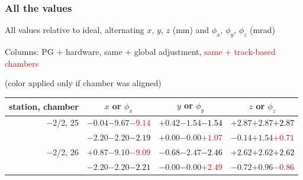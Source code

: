 \documentclass[compress]{beamer}
\begin{document}
\begin{frame}
\frametitle{All the values}
\tiny

All values relative to ideal, alternating $x$, $y$, $z$ (mm) and $\phi_x$, $\phi_y$, $\phi_z$ (mrad)

Columns: PG $+$ hardware, same $+$ global adjustment, \textcolor{red}{same $+$ track-based chambers}

\hfill (color applied only if chamber was aligned)

\vfill
\renewcommand{\arraystretch}{1.1}
\begin{tabular}{r | c | c | c}
station, chamber & $x$ or $\phi_x$ & $y$ or $\phi_y$ & $z$ or $\phi_z$ \\\hline
$-$2/2, 25 & $-0.04$\hspace{0.1 cm}$-9.67$\hspace{0.1 cm}\textcolor{red}{$-9.14$} & $+0.42$\hspace{0.1 cm}$-1.54$\hspace{0.1 cm}\textcolor{black}{$-1.54$} & $+2.87$\hspace{0.1 cm}$+2.87$\hspace{0.1 cm}\textcolor{black}{$+2.87$} \\
           & $-2.20$\hspace{0.1 cm}$-2.20$\hspace{0.1 cm}\textcolor{black}{$-2.19$} & $+0.00$\hspace{0.1 cm}$-0.00$\hspace{0.1 cm}\textcolor{red}{$+1.07$} & $-0.14$\hspace{0.1 cm}$+1.54$\hspace{0.1 cm}\textcolor{red}{$+0.71$} \\
$-$2/2, 26 & $+0.87$\hspace{0.1 cm}$-9.10$\hspace{0.1 cm}\textcolor{red}{$-9.09$} & $-0.68$\hspace{0.1 cm}$-2.47$\hspace{0.1 cm}\textcolor{black}{$-2.46$} & $+2.62$\hspace{0.1 cm}$+2.62$\hspace{0.1 cm}\textcolor{black}{$+2.62$} \\
           & $-2.20$\hspace{0.1 cm}$-2.20$\hspace{0.1 cm}\textcolor{black}{$-2.21$} & $-0.00$\hspace{0.1 cm}$-0.00$\hspace{0.1 cm}\textcolor{red}{$+2.49$} & $-0.72$\hspace{0.1 cm}$+0.96$\hspace{0.1 cm}\textcolor{red}{$-0.86$} \\

\end{tabular}
\end{frame}
\end{document}
